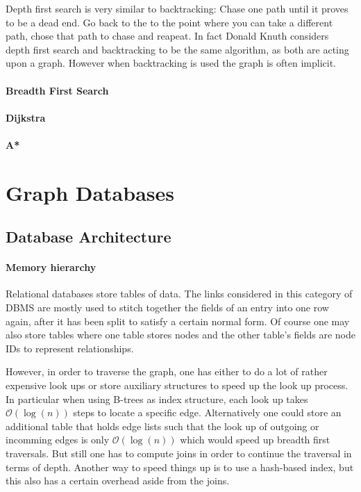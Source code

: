         Depth first search is very similar to backtracking: Chase one path until it proves to be a dead end. 
        Go back to the to the point where you can take a different path, chose that path to chase and reapeat. In fact Donald Knuth considers depth first search and backtracking to be the same algorithm, as both are acting upon a graph. However when backtracking is used the graph is often implicit.~\autocite{}
        
        \paragraph{Breadth First Search} 
        \paragraph{Dijkstra}
        \paragraph{A*}
        
            
\section{Graph Databases}\label{\positionnumber}
    \subsection{Database Architecture}\label{\positionnumber}
            \paragraph{Memory hierarchy}
        Relational databases store tables of data.
        The links considered in this category of DBMS are mostly used to stitch together the fields of an entry into one row again, after it has been split to satisfy a certain normal form.
        Of course one may also store tables where one table stores nodes and the other table's fields are node IDs to represent relationships.

        However, in order to traverse the graph, one has either to do a lot of rather expensive look ups or store auxiliary structures to speed up the look up process.
        In particular when using B-trees as index structure, each look up takes $\mathcal{O}(\log(n))$ steps to locate a specific edge.
        Alternatively one could store an additional table that holds edge lists such that the look up of outgoing or incomming edges is only $\mathcal{O}(\log(n))$ which would speed up breadth first traversals.
        But still one has to compute joins in order to continue the traversal in terms of depth.
        Another way to speed things up is to use a hash-based index, but this also has a certain overhead aside from the joins.

